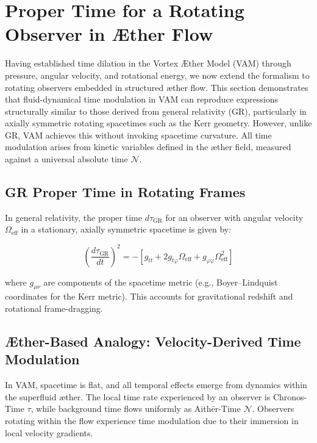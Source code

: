 \section{Proper Time for a Rotating Observer in Æther Flow}

Having established time dilation in the Vortex Æther Model (VAM) through pressure, angular velocity, and rotational energy, we now extend the formalism to rotating observers embedded in structured æther flow. This section demonstrates that fluid-dynamical time modulation in VAM can reproduce expressions structurally similar to those derived from general relativity (GR), particularly in axially symmetric rotating spacetimes such as the Kerr geometry. However, unlike GR, VAM achieves this without invoking spacetime curvature. All time modulation arises from kinetic variables defined in the æther field, measured against a universal absolute time \( \mathcal{N} \).

\subsection{GR Proper Time in Rotating Frames}

In general relativity, the proper time \( d\tau_{\text{GR}} \) for an observer with angular velocity \( \Omega_\text{eff} \) in a stationary, axially symmetric spacetime is given by:

\begin{equation}
 \left( \frac{d\tau_{\text{GR}}}{dt} \right)^2 = -\left[ g_{tt} + 2g_{t\varphi} \Omega_\text{eff} + g_{\varphi\varphi} \Omega_\text{eff}^2 \right]
 \label{eq:GR_proper_time}
\end{equation}

where \( g_{\mu\nu} \) are components of the spacetime metric (e.g., Boyer–Lindquist coordinates for the Kerr metric). This accounts for gravitational redshift and rotational frame-dragging.

\subsection{Æther-Based Analogy: Velocity-Derived Time Modulation}

In VAM, spacetime is flat, and all temporal effects emerge from dynamics within the superfluid æther. The local time rate experienced by an observer is Chronos-Time \( \tau \), while background time flows uniformly as Aithēr-Time \( \mathcal{N} \). Observers rotating within the flow experience time modulation due to their immersion in local velocity gradients.

